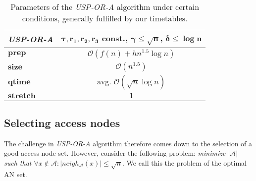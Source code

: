 \documentclass{svk_long_en}
\begin{document}
		\begin{table}[h!]
			\centering
			\footnotesize
			\begin{tabular}{l|c}
				\cellcolor{oracle-clr} \textit{\textbf{USP-OR-A}} & 
				\cellcolor{oracle-clr} \parbox{3cm}{\textbf{$\bm{\tau, r_{1}, r_{2}, r_{3}}$ const., $\bm{\gamma \leq \sqrt{n}}$, $\bm{\delta \leq \log n}$}} \\ [1.5ex]
				\hline
				 $\bm{prep}$ & $\mathcal{O}(f(n) + h n^{1.5} \log n)$ \\
				 $\bm{size}$ & $\mathcal{O}(n^{1.5})$ \\
				 $\bm{qtime}$ & avg. $\mathcal{O}(\sqrt{n} \log n)$ \\
				 $\bm{stretch}$ & $1$ \\
			\end{tabular}
			\caption{\label{tab:uspora-cond} Parameters of the \textit{USP-OR-A} algorithm under certain conditions, generally fulfilled by our timetables.}
		\end{table}
		
	\subsection{Selecting access nodes}
	
		The challenge in \textit{USP-OR-A} algorithm therefore comes down to the selection of a good access node set. However, consider the following problem: \textit{minimize $|\mathcal{A}|$ such that $\forall x \not \in \mathcal{A}: |neigh_{\mathcal{A}}(x)| \leq \sqrt{n}$}. We call this the problem of the optimal AN set.
		
\end{document}
